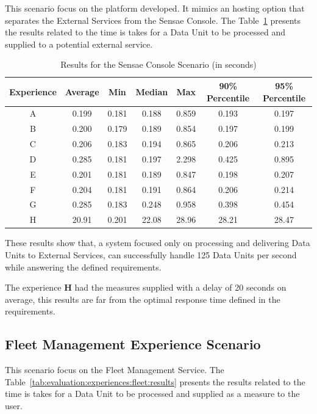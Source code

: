 This scenario focus on the platform developed. It mimics an hosting option that separates the External Services from the Sensae Console. The Table~\ref{tab:evaluation:experiences:platform:results} presents the results related to the time is takes for a Data Unit to be processed and supplied to a potential external service.

\begin{table}[H]
    \caption{Results for the Sensae Console Scenario (in seconds)}
    \label{tab:evaluation:experiences:platform:results}
    \centering
    \begin{tabular}{@{}ccccccc@{}}
    \toprule
    \textbf{Experience} & \textbf{Average} & \textbf{Min} & \textbf{Median} & \textbf{Max} & \textbf{90\% Percentile} & \textbf{95\% Percentile} \\ \midrule
    A & 0.199 & 0.181 & 0.188 & 0.859 & 0.193 & 0.197 \\ \midrule
    B & 0.200 & 0.179 & 0.189 & 0.854 & 0.197 & 0.199 \\ \midrule
    C & 0.206 & 0.183 & 0.194 & 0.865 & 0.206 & 0.213 \\ \midrule
    D & 0.285 & 0.181 & 0.197 & 2.298 & 0.425 & 0.895 \\ \midrule
    E & 0.201 & 0.181 & 0.189 & 0.847 & 0.198 & 0.207 \\ \midrule
    F & 0.204 & 0.181 & 0.191 & 0.864 & 0.206 & 0.214 \\ \midrule
    G & 0.285 & 0.183 & 0.248 & 0.958 & 0.398 & 0.454 \\ \midrule
    H & 20.91 & 0.201 & 22.08 & 28.96 & 28.21 & 28.47 \\ \bottomrule
    \end{tabular}
\end{table}

These results show that, a system focused only on processing and delivering Data Units to External Services, can successfully handle 125 Data Units per second while answering the defined requirements.

The experience \textbf{H} had the measures supplied with a delay of 20 seconds on average, this results are far from the optimal response time defined in the requirements.

\subsection{Fleet Management Experience Scenario}
\label{subsec:evaluation:experiences:fleet}

This scenario focus on the Fleet Management Service. The Table~\ref{tab:evaluation:experiences:fleet:results} presents the results related to the time is takes for a Data Unit to be processed and supplied as a measure to the user.

